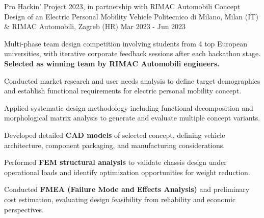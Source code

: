 
\cventry
{Pro Hackin' Project 2023, in partnership with RIMAC Automobili}
{Concept Design of an Electric Personal Mobility Vehicle}
{Politecnico di Milano, Milan (IT) \& RIMAC Automobili, Zagreb (HR)}
{Mar 2023 - Jun 2023}
{
    Multi-phase team design competition involving students from 4 top European universities, with iterative corporate feedback sessions after each hackathon stage.
    \textbf{Selected as winning team by RIMAC Automobili engineers.}
    \newline
    \vspace{4mm}
    \begin{cvitems}
        \item {Conducted market research and user needs analysis to define target demographics and establish functional requirements for electric personal mobility concept.}
        \item {Applied systematic design methodology including functional decomposition and morphological matrix analysis to generate and evaluate multiple concept variants.}
        \item {Developed detailed \textbf{CAD models} of selected concept, defining vehicle architecture, component packaging, and manufacturing considerations.}
        \item {Performed \textbf{FEM structural analysis} to validate chassis design under operational loads and identify optimization opportunities for weight reduction.}
        \item {Conducted \textbf{FMEA (Failure Mode and Effects Analysis)} and preliminary cost estimation, evaluating design feasibility from reliability and economic perspectives.}
    \end{cvitems}
}